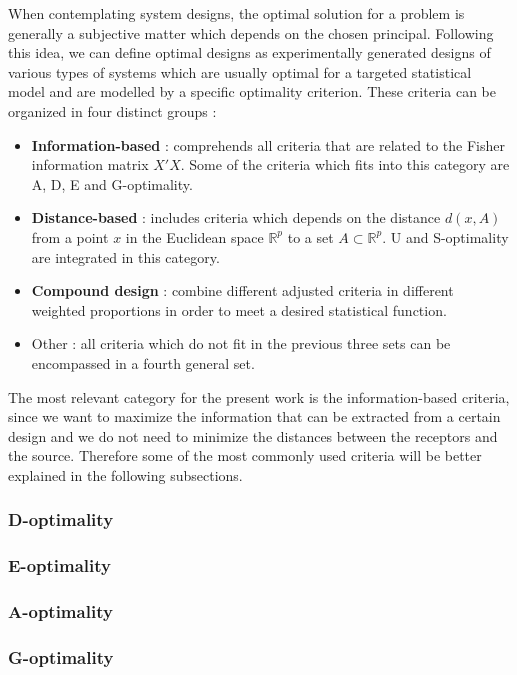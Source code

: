 When contemplating system designs, the optimal solution for a problem is generally a subjective matter which depends on the chosen principal. Following this idea, we can define optimal designs as experimentally generated designs of various types of systems which are usually optimal for a targeted statistical model and are modelled by a specific optimality criterion. These criteria can be organized in four distinct groups \cite{compare-optimality-crit}:
\begin{itemize}
	\item \textbf{Information-based} : comprehends all criteria that are related to the Fisher information matrix $X'X$. Some of the criteria which fits into this category are A, D, E and G-optimality.
	\item \textbf{Distance-based} : includes criteria which depends on the distance $d(x,A)$ from a point $x$ in the Euclidean space $\mathbb{R}^{p}$ to a set $A \subset \mathbb{R}^{p}$. U and S-optimality are integrated in this category.
	\item \textbf{Compound design} : combine different adjusted criteria in different weighted proportions in order to meet a desired statistical function.
	\item Other : all criteria which do not fit in the previous three sets can be encompassed in a fourth general set.
\end{itemize}

The most relevant category for the present work is the information-based criteria, since we want to maximize the information that can be extracted from a certain design and we do not need to minimize the distances between the receptors and the source. Therefore some of the most commonly used criteria will be better explained in the following subsections.

\subsubsection{D-optimality}

\subsubsection{E-optimality}

\subsubsection{A-optimality}

\subsubsection{G-optimality}